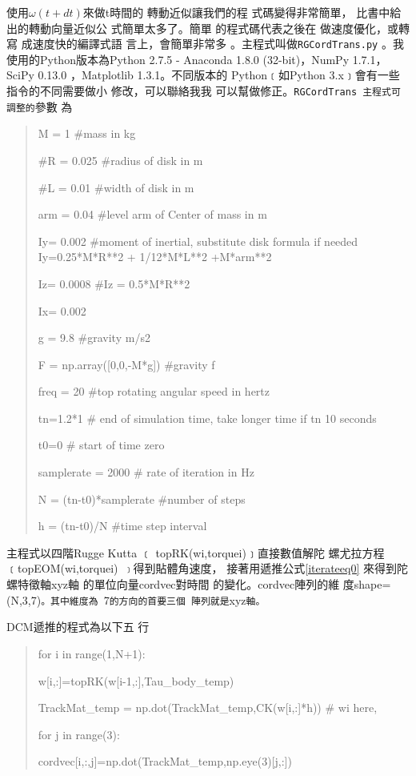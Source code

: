 \documentclass[12pt,twoside]{article}
\begin{document}
使用$\omega (t+dt)$來做t時間的%
轉動近似讓我們的程%
式碼變得非常簡單，%
比書中\cite[Page 301, Equation 10.24]{titterton}給%
出的轉動向量近似公%
式簡單太多了。簡單%
的程式碼代表之後在%
做速度優化，或轉寫%
成速度快的編譯式語%
言上，會簡單非常多%
。主程式叫做\texttt{RGCordTrans.py}%
。我使用的Python版本為Python
2.7.5 - Anaconda 1.8.0 (32-bit)，NumPy 1.7.1，SciPy 0.13.0%
，Matplotlib 1.3.1。不同版本的%
Python﹝如Python 3.x﹞會有一些%
指令的不同需要做小%
修改，可以聯絡我我%
可以幫做修正。\texttt{RGCordTrans%
主程式可調整的}參數%
為

\begin{quotation}
M = 1 \#mass in kg

\#R = 0.025 \#radius of disk in m

\#L = 0.01 \#width of disk in m

arm = 0.04 \#level arm of Center of mass in m

Iy= 0.002 \#moment of inertial, substitute disk formula if needed
Iy=0.25*M*R**2 + 1/12*M*L**2 +M*arm**2

Iz= 0.0008 \#Iz = 0.5*M*R**2

Ix= 0.002

g = 9.8 \#gravity m/s2

F = np.array([0,0,-M*g]) \#gravity f

freq = 20 \#top rotating angular speed in hertz

tn=1.2*1 \# end of simulation time, take longer time if tn \TEXTsymbol{>} 10
seconds

t0=0 \# start of time zero

samplerate = 2000 \# rate of iteration in Hz

N = (tn-t0)*samplerate \#number of steps

h = (tn-t0)/N \#time step interval
\end{quotation}

主程式以四階Rugge Kutta ﹝%
topRK(wi,torquei)﹞直接數值解陀%
螺尤拉方程﹝topEOM(wi,torquei)\texttt{%
﹞}得到貼體角速度，%
接著用遞推公式\ref{iterateeq0}%
來得到陀螺特徵軸xyz軸%
的單位向量cordvec對時間%
的變化。cordvec陣列的維%
度shape=(N,3,7)\texttt{。其中維度為%
}7\texttt{的方向的首要三個%
陣列就是}xyz\texttt{軸。}

DCM遞推的程式為以下五%
行

\begin{quotation}
for i in range(1,N+1):

w[i,:]=topRK(w[i-1,:],Tau\_body\_temp)

TrackMat\_temp = np.dot(TrackMat\_temp,CK(w[i,:]*h)) \qquad \# wi here,

for j in range(3):

cordvec[i,:,j]=np.dot(TrackMat\_temp,np.eye(3)[j,:])
\end{quotation}
\end{document}
